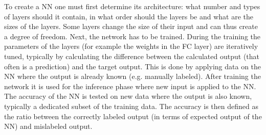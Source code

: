 \documentclass[../thesis.tex]{subfiles}
\begin{document}



To create a NN one must first determine its architecture: what number and types of layers should it contain, in what order should the layers be and what are the sizes of the layers. Some layers change the size of their input and can thus create a degree of freedom. Next, the network has to be trained. During the training the parameters of the layers (for example the weights in the FC layer) are iteratively tuned, typically by calculating the difference between the calculated output (that often is a prediction) and the target output. This is done by applying data on the NN where the output is already known (e.g. manually labeled). After training the network it is used for the inference phase where new input is applied to the NN. The accuracy of the NN is tested on new data where the output is also known, typically a dedicated subset of the training data. The accuracy is then defined as the ratio between the correctly labeled output (in terms of expected output of the NN) and mislabeled output.
\end{document}

